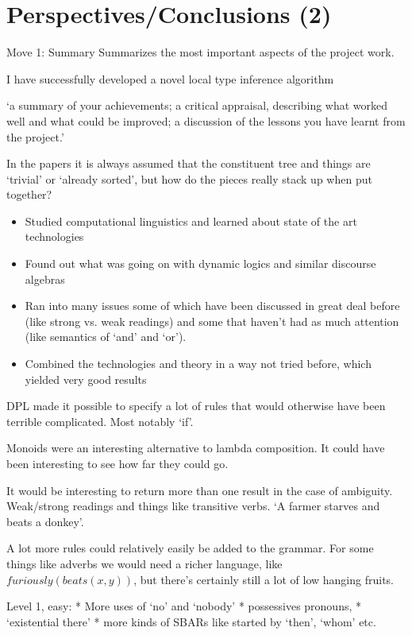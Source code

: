 \documentclass[12pt]{article}
\let\stdsection\section
\renewcommand\section{\newpage\stdsection}
\begin{document}
\section{Perspectives/Conclusions (2)}

Move 1: Summary 
Summarizes the most important aspects of the project work.  

I have successfully developed a novel local type inference algorithm

‘a summary of your achievements; a critical appraisal, describing what worked well and what could be 
improved; a discussion of the lessons you have learnt from the project.’

In the papers it is always assumed that the constituent tree and things are `trivial' or `already sorted', but how do the pieces really stack up when put together?


\begin{itemize}
\item Studied computational linguistics and learned about state of the art technologies
\item Found out what was going on with dynamic logics and 
similar discourse algebras
\item Ran into many issues some of which have been discussed in great deal before (like strong vs. weak readings) and some that haven't had as much attention (like semantics of `and' and `or').
\item Combined the technologies and theory in a way not tried before, which yielded very good results
\end{itemize}

DPL made it possible to specify a lot of rules that would otherwise have been terrible complicated. Most notably `if'.

Monoids were an interesting alternative to lambda composition. It could have been interesting to see how far they could go.

It would be interesting to return more than one result in the case of ambiguity. Weak/strong readings and things like transitive verbs. `A farmer starves and beats a donkey'.

A lot more rules could relatively easily be added to the grammar. For some things like adverbs we would need a richer language, like $furiously(beats(x,y))$, but there's certainly still a lot of low hanging fruits.

Level 1, easy:
* More uses of `no' and `nobody'
* possessives pronouns, 
* `existential there'
* more kinds of SBARs like started by `then', `whom' etc.
\end{document}
